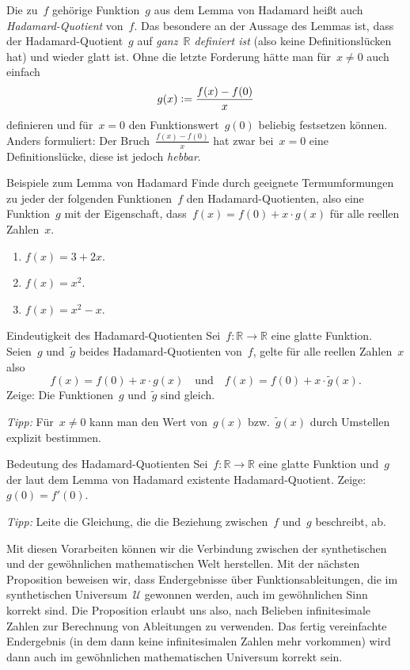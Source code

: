 \documentclass[twoside]{../zirkelblatt}
\newcommand{\RR}{\mathbb{R}}
\newcommand{\U}{\mathcal{U}}
\newcommand{\defeq}{\vcentcolon=}
\theoremstyle{definition}
\theoremstyle{plain}
\theoremstyle{remark}
\begin{document}
Die zu~$f$ gehörige Funktion~$g$ aus dem Lemma von Hadamard heißt auch
\emph{Hadamard-Quotient} von~$f$. Das besondere an der Aussage des Lemmas ist,
dass der Hadamard-Quotient~$g$ auf \emph{ganz~$\RR$ definiert ist} (also keine
Definitionslücken hat) und wieder glatt ist. Ohne
die letzte Forderung hätte man für~$x \neq 0$ auch einfach
\[ g(x) \defeq \frac{f(x) - f(0)}{x} \]
definieren und für~$x = 0$ den Funktionswert~$g(0)$ beliebig festsetzen können.
Anders formuliert: Der Bruch~$\frac{f(x) - f(0)}{x}$ hat zwar bei~$x = 0$ eine
Definitionslücke, diese ist jedoch \emph{hebbar}.\enlargethispage{1em}

\begin{aufgabeShaded}{Beispiele zum Lemma von Hadamard}
Finde durch geeignete Termumformungen zu jeder der folgenden Funktionen~$f$ den
Hadamard-Quotienten, also eine Funktion~$g$ mit der Eigenschaft, dass~$f(x) =
f(0) + x \cdot g(x)$ für alle reellen Zahlen~$x$.
\begin{enumerate}
\item $f(x) = 3 + 2x$.
\item $f(x) = x^2$.
\item $f(x) = x^2 - x$.
\end{enumerate}
\end{aufgabeShaded}

\begin{aufgabeShaded}{Eindeutigkeit des Hadamard-Quotienten}
Sei~$f : \RR \to \RR$ eine glatte Funktion. Seien~$g$ und~$\widetilde g$ beides
Hadamard-Quotienten von~$f$, gelte für alle reellen Zahlen~$x$ also
\[ f(x) = f(0) + x \cdot g(x) \quad\text{und}\quad f(x) = f(0) + x \cdot \widetilde g(x). \]
Zeige: Die Funktionen~$g$ und~$\widetilde g$ sind gleich.

\emph{Tipp:} Für~$x \neq 0$ kann man den Wert von~$g(x)$ bzw.~$\widetilde g(x)$
durch Umstellen explizit bestimmen.
\end{aufgabeShaded}

\begin{aufgabeShaded}{Bedeutung des Hadamard-Quotienten}
\label{aufg:bedeutung-hadamard}
Sei~$f : \RR \to \RR$ eine glatte Funktion und~$g$ der laut dem
Lemma von Hadamard existente Hadamard-Quotient. Zeige: $g(0) = f'(0)$.

\emph{Tipp:} Leite die Gleichung, die die Beziehung zwischen~$f$
und~$g$ beschreibt, ab.
\end{aufgabeShaded}

Mit diesen Vorarbeiten können wir die Verbindung zwischen der synthetischen und
der gewöhnlichen mathematischen Welt herstellen. Mit der nächsten Proposition
beweisen wir, dass Endergebnisse über Funktionsableitungen, die im
synthetischen Universum~$\U$ gewonnen werden, auch im gewöhnlichen Sinn korrekt
sind. Die Proposition erlaubt uns also, nach Belieben infinitesimale Zahlen zur
Berechnung von Ableitungen zu verwenden. Das fertig vereinfachte Endergebnis
(in dem dann keine infinitesimalen Zahlen mehr vorkommen) wird dann auch im
gewöhnlichen mathematischen Universum korrekt sein.
\end{document}
